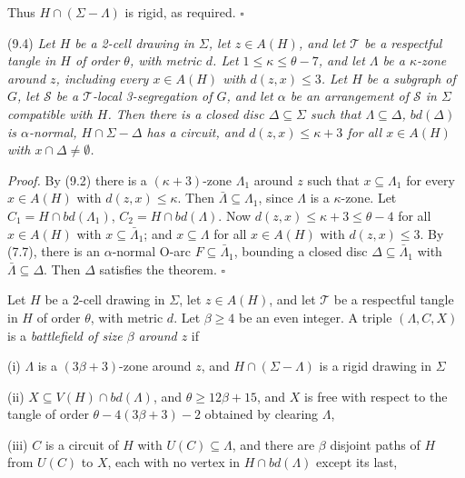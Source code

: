 Thus $H \cap (\Sigma - \Lambda)$ is rigid, as required. $\square$

\stmt
(9.4) \textit{Let $H$ be a 2-cell drawing in $\Sigma$, let $z \in A(H)$, and let $\mathscr{T}$ be a respectful tangle in $H$ of order $\theta$, with metric $d$. Let $1 \le \kappa \le \theta - 7$, and let $\Lambda$ be a $\kappa$-zone around $z$, including every $x \in A(H)$ with $d(z, x) \le 3$. Let $H$ be a subgraph of $G$, let $\mathscr{S}$ be a $\mathscr{T}$-local 3-segregation of $G$, and let $\alpha$ be an arrangement of $\mathscr{S}$ in $\Sigma$ compatible with $H$. Then there is a closed disc $\Delta \subseteq \Sigma$ such that $\Lambda \subseteq \Delta$, $bd(\Delta)$ is $\alpha$-normal, $H \cap \Sigma - \Delta$ has a circuit, and $d(z, x) \le \kappa + 3$ for all $x \in A(H)$ with $x \cap \Delta \ne \emptyset$.}

\textit{Proof.} By (9.2) there is a $(\kappa + 3)$-zone $\Lambda_1$ around $z$ such that $x \subseteq \Lambda_1$ for every $x \in A(H)$ with $d(z, x) \le \kappa$. Then $\bar{\Lambda} \subseteq \Lambda_1$, since $\Lambda$ is a $\kappa$-zone. Let $C_1 = H \cap bd(\Lambda_1)$, $C_2 = H \cap bd(\Lambda)$. Now $d(z, x) \le \kappa + 3 \le \theta - 4$ for all $x \in A(H)$ with $x \subseteq \bar{\Lambda}_1$; and $x \subseteq \Lambda$ for all $x \in A(H)$ with $d(z, x) \le 3$. By (7.7), there is an $\alpha$-normal O-arc $F \subseteq \bar{\Lambda}_1$, bounding a closed disc $\Delta \subseteq \bar{\Lambda}_1$ with $\bar{\Lambda} \subseteq \Delta$. Then $\Delta$ satisfies the theorem. $\square$

Let $H$ be a 2-cell drawing in $\Sigma$, let $z \in A(H)$, and let $\mathscr{T}$ be a respectful tangle in $H$ of order $\theta$, with metric $d$. Let $\beta \ge 4$ be an even integer. A triple $(\Lambda, C, X)$ is a \textit{battlefield of size $\beta$ around $z$} if

\hspace*{12pt}(i) $\Lambda$ is a $(3\beta + 3)$-zone around $z$, and $H \cap (\Sigma - \Lambda)$ is a rigid drawing in $\Sigma$

\hspace*{12pt}(ii) $X \subseteq V(H) \cap bd(\Lambda)$, and $\theta \ge 12\beta + 15$, and $X$ is free with respect to the tangle of order $\theta - 4(3\beta + 3) - 2$ obtained by clearing $\Lambda$,

\hspace*{12pt}(iii) $C$ is a circuit of $H$ with $U(C) \subseteq \Lambda$, and there are $\beta$ disjoint paths of $H$ from $U(C)$ to $X$, each with no vertex in $H \cap bd(\Lambda)$ except its last,

